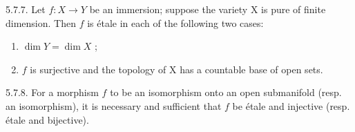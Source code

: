 5.7.7. Let \(f:X\to Y\) be an immersion; suppose the variety X is pure of finite dimension. Then \(f\) is étale in each of the following two cases:

\begin{enumerate}
\def\labelenumi{(\roman{enumi})}
\item
  \(\dim Y = \dim X\) ;
\item
  \(f\) is surjective and the topology of X has a countable base of open sets.
\end{enumerate}

5.7.8. For a morphism \(f\) to be an isomorphism onto an open submanifold (resp. an isomorphism), it is necessary and sufficient that \(f\) be étale and injective (resp. étale and bijective).

